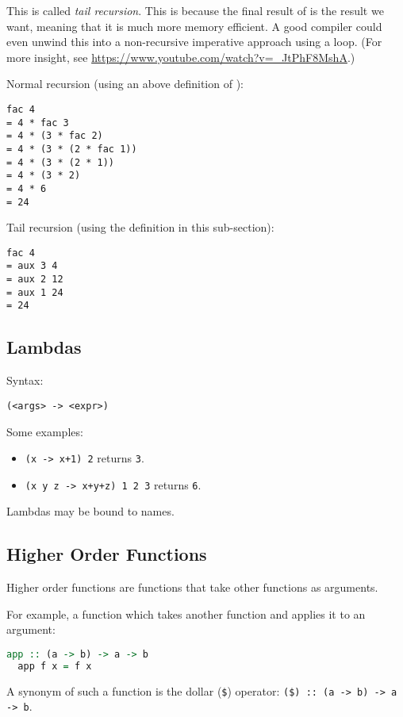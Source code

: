 This is called \textit{tail recursion}. This is because the final result of \texttt{} is the result we want, meaning that it is much more memory efficient. A good compiler could even unwind this into a non-recursive imperative approach using a loop. (For more insight, see \url{https://www.youtube.com/watch?v=_JtPhF8MshA}.)

Normal recursion (using an above definition of \texttt{}):
\begin{verbatim}
fac 4
= 4 * fac 3
= 4 * (3 * fac 2)
= 4 * (3 * (2 * fac 1))
= 4 * (3 * (2 * 1))
= 4 * (3 * 2)
= 4 * 6
= 24
\end{verbatim}

Tail recursion (using the definition in this sub-section):
\begin{verbatim}
fac 4
= aux 3 4
= aux 2 12
= aux 1 24
= 24
\end{verbatim}

\subsection{Lambdas}
Syntax:
\begin{center}
  \texttt{(<args> -> <expr>)}
\end{center}

Some examples:
\begin{itemize}
  \item \texttt{(x -> x+1) 2} returns \texttt{3}.
  \item \texttt{(x y z -> x+y+z) 1 2 3} returns \texttt{6}.
\end{itemize}
Lambdas may be bound to names.

\subsection{Higher Order Functions}
Higher order functions are functions that take other functions as arguments.

For example, a function which takes another function and applies it to an argument:
\begin{lstlisting}[language=haskell]
  app :: (a -> b) -> a -> b
  app f x = f x
\end{lstlisting}
A synonym of such a function is the dollar (\texttt{\$}) operator: \texttt{(\$) :: (a -> b) -> a -> b}.

